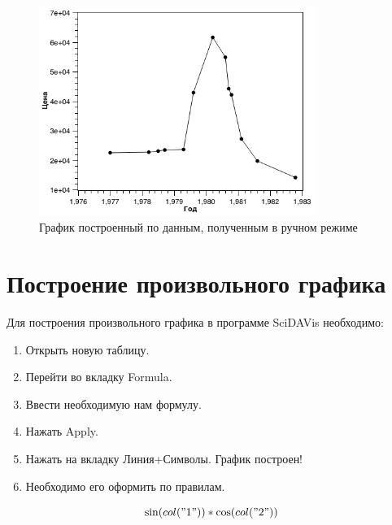 \documentclass[a4paper,14pt,russian]{report}
\begin{document}
\begin{figure}[!htb]
  \centerline{\includegraphics[width=0.8\textwidth]{graph-custom-manual}}
  \caption{График построенный по данным, полученным в ручном режиме}
  \label{graph:custom-manual}
\end{figure}

\section{Построение произвольного графика}

Для построения произвольного графика в программе SciDAVis необходимо:

\begin{enumerate}
  \item Открыть новую таблицу.
  \item Перейти во вкладку Formula.
  \item Ввести необходимую нам формулу.
  \item Нажать Apply.
  \item Нажать на вкладку Линия+Символы. График построен!
  \item Необходимо его оформить по правилам.
\end{enumerate}

\begin{equation*}
  \sin(col("1"))*\cos(col("2"))
\end{equation*}
\end{document}
